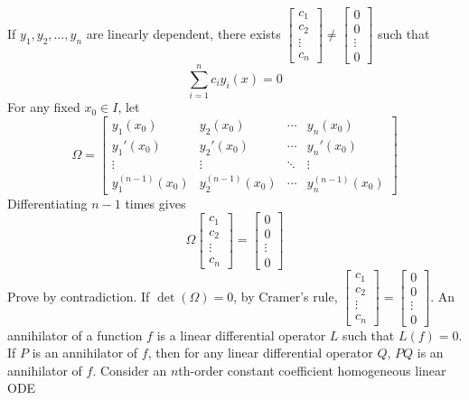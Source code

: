 \documentclass[a4paper,12pt]{report}
\begin{document}
If $y_1,y_2,\ldots,y_n$ are linearly dependent, there exists $\begin{bmatrix}c_1\\c_2\\\vdots\\c_n\end{bmatrix}\ne\begin{bmatrix}0\\0\\\vdots\\0\end{bmatrix}$ such that
\[\sum_{i=1}^nc_iy_i(x)=0\]
For any fixed $x_0\in I$, let
\[\Omega=\begin{bmatrix}
y_1(x_0) & y_2(x_0) & \cdots & y_n(x_0) \\
y_1'(x_0) & y_2'(x_0) & \cdots & y_n'(x_0) \\
\vdots & \vdots & \ddots & \vdots \\
y_1^{(n-1)}(x_0) & y_2^{(n-1)}(x_0) & \cdots & y_n^{(n-1)}(x_0)
\end{bmatrix}\]
Differentiating $n-1$ times gives
\[\Omega\begin{bmatrix}c_1\\c_2\\\vdots\\c_n\end{bmatrix}=\begin{bmatrix}0\\0\\\vdots\\0\end{bmatrix}\]
Prove by contradiction. If $\det(\Omega)=0$, by Cramer's rule, $\begin{bmatrix}c_1\\c_2\\\vdots\\c_n\end{bmatrix}=\begin{bmatrix}0\\0\\\vdots\\0\end{bmatrix}$.
\epr
{}
An annihilator of a function $f$ is a linear differential operator $L$ such that $L(f)=0$.
If $P$ is an annihilator of $f$, then for any linear differential operator $Q$, $PQ$ is an annihilator of $f$.
Consider an $n$th-order constant coefficient homogeneous linear ODE
\end{document}
